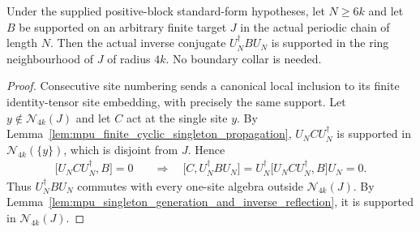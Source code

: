 \begin{lemma}
    \label{lem:mpu_finite_cyclic_inverse_propagation}
    \leanok
    Under the supplied positive-block standard-form hypotheses, let
    $N\geq 6k$ and let $B$ be supported on an arbitrary finite target
    $J$ in the actual periodic chain of length $N$. Then the actual
    inverse conjugate $U_N^\dagger B U_N$ is supported in the ring
    neighbourhood of $J$ of radius $4k$. No boundary collar is needed.
\end{lemma}
\begin{proof}\leanok
    Consecutive site numbering sends a canonical local inclusion to
    its finite identity-tensor site embedding, with precisely the
    same support. Let $y\notin\mathcal N_{4k}(J)$ and let $C$ act at
    the single site $y$. By
    Lemma~\ref{lem:mpu_finite_cyclic_singleton_propagation},
    $U_NCU_N^\dagger$ is supported in $\mathcal N_{4k}(\{y\})$, which
    is disjoint from $J$. Hence
    \begin{align}
        \bigl[U_NCU_N^\dagger,B\bigr]=0
         & \quad\Longrightarrow\quad
        \bigl[C,U_N^\dagger BU_N\bigr]
        =U_N^\dagger\bigl[U_NCU_N^\dagger,B\bigr]U_N=0.
    \end{align}
    Thus $U_N^\dagger BU_N$ commutes with every one-site algebra outside
    $\mathcal N_{4k}(J)$. By
    Lemma~\ref{lem:mpu_singleton_generation_and_inverse_reflection}, it
    is supported in $\mathcal N_{4k}(J)$.
\end{proof}


